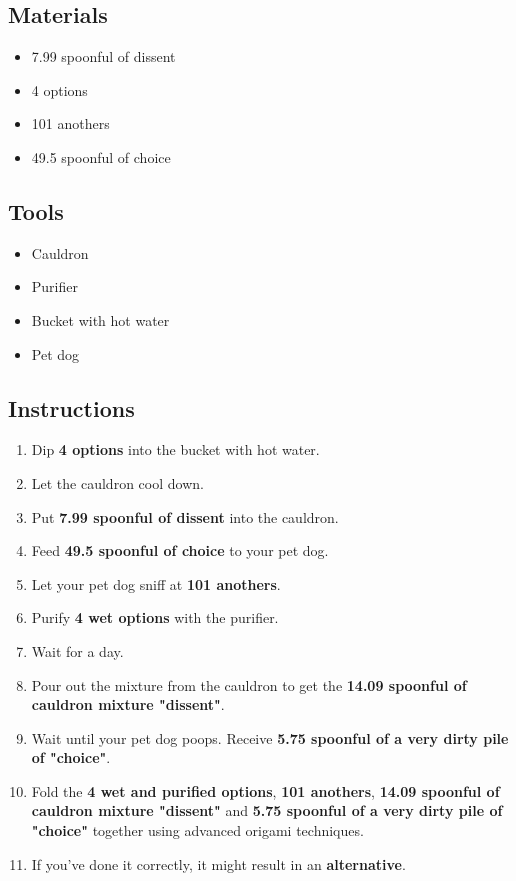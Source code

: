 \documentclass{article}
\begin{document}
\subsection{Materials}\begin{itemize}
\item 
7.99 spoonful of dissent
\item 
4 options
\item 
101 anothers
\item 
49.5 spoonful of choice
\end{itemize}
\subsection{Tools}\begin{itemize}
\item 
Cauldron
\item 
Purifier
\item 
Bucket with hot water
\item 
Pet dog
\end{itemize}
\subsection{Instructions}\begin{enumerate}
\item 
Dip \textbf{4 options} into the bucket with hot water.
\item 
Let the cauldron cool down.
\item 
Put \textbf{7.99 spoonful of dissent} into the cauldron.
\item 
Feed \textbf{49.5 spoonful of choice} to your pet dog.
\item 
Let your pet dog sniff at \textbf{101 anothers}.
\item 
Purify \textbf{4 wet options} with the purifier.
\item 
Wait for a day.
\item 
Pour out the mixture from the cauldron to get the \textbf{14.09 spoonful of cauldron mixture "dissent"}.
\item 
Wait until your pet dog poops. Receive \textbf{5.75 spoonful of a very dirty pile of "choice"}.
\item 
Fold the \textbf{4 wet and purified options}, \textbf{101 anothers}, \textbf{14.09 spoonful of cauldron mixture "dissent"} and \textbf{5.75 spoonful of a very dirty pile of "choice"} together using advanced origami techniques.
\item 
If you've done it correctly, it might result in an \textbf{alternative}.
\end{enumerate}
\newpage
\end{document}
